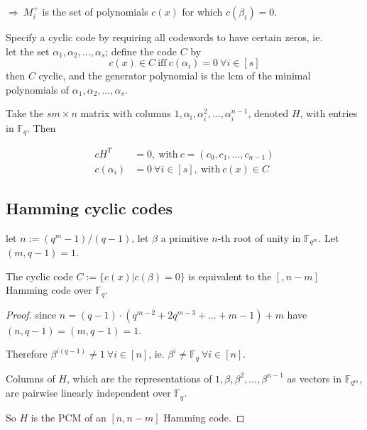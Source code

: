 \documentclass{article}
\theoremstyle{definition}
\newenvironment{thm}[1]
{\renewcommand\theinnerthm{#1}\innerthm}
{\endinnerthm}
\begin{document}
$\Longrightarrow~ M_i^+$ is the set of polynomials $c(x)$ for which $c(\beta_i)=0$.

\vspace{0.5cm}

Specify a cyclic code by requiring all codewords to have certain zeros, ie.\\
let the set $\alpha_1, \alpha_2, \ldots, \alpha_s$; define the code $C$ by
$$c(x) \in C ~\text{iff}~ c(\alpha_i)=0 ~\forall i \in [s]$$
then $C$ cyclic, and the generator polynomial is the lcm of the minimal polynomials of $\alpha_1, \alpha_2, \ldots, \alpha_s$.


\vspace{0.6cm}
Take the $sm \times n$ matrix with columns $1, \alpha_i, \alpha_i^2, \ldots,
\alpha_i^{n-1}$, denoted $H$, with entries in $\mathbb{F}_q$. Then

\begin{align*}
  cH^T&=0, ~\text{with}~ c=(c_0, c_1, \ldots, c_{n-1})\\
  c(\alpha_i)&=0 ~\forall i \in [s], ~\text{with}~ c(x) \in C
\end{align*}


\subsection{Hamming cyclic codes}
\begin{thm}{6.3.1}
  let $n := (q^m - 1)/(q-1)$, let $\beta$ a primitive $n$-th root of unity in $\mathbb{F}_{q^m}$. Let $(m, q-1)=1$.

  The cyclic code $C:= \{ c(x) | c(\beta)=0 \}$ is equivalent to the $[, n-m]$ Hamming code over $\mathbb{F}_q$.
\end{thm}
\begin{proof}
  since $n=(q-1) \cdot (q^{m-2} + 2 q^{m-3} + \ldots + m-1) + m$ have $(n, q-1) = (m, q-1) = 1$.

  Therefore $\beta^{i(q-1)} \neq 1 ~\forall i \in [n]$, ie. $\beta^i \neq \mathbb{F}_q ~\forall i \in [n]$.

  Columns of $H$, which are the representations of $1, \beta, \beta^2, \ldots, \beta^{n-1}$ as vectors in $\mathbb{F}_{q^m}$, are pairwise linearly independent over $\mathbb{F}_q$.

  So $H$ is the PCM of an $[n, n-m]$ Hamming code.
\end{proof}
\end{document}
